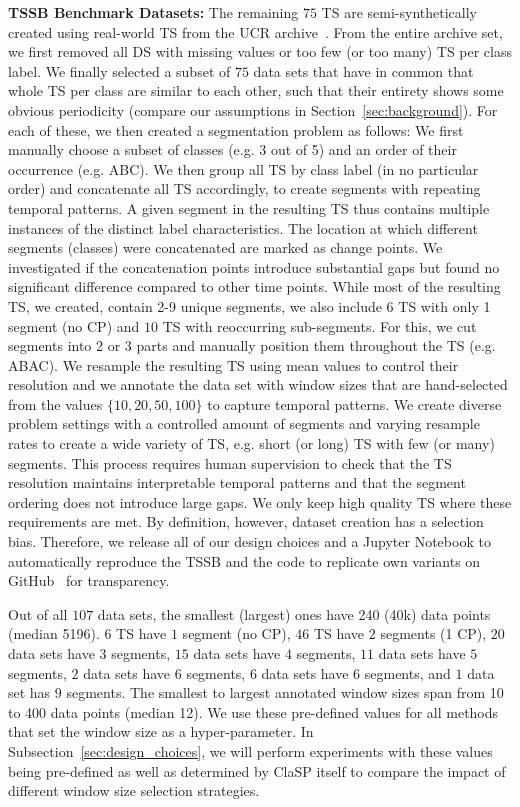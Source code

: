 \documentclass[pdflatex,sn-basic]{sn-jnl}
\begin{document}
\textbf{TSSB Benchmark Datasets:} The remaining $75$ TS are semi-synthetically created using real-world TS from the UCR archive~\citep{UCRClassification}. From the entire archive set, we first removed all DS with missing values or too few (or too many) TS per class label. We finally selected a subset of $75$ data sets that have in common that whole TS per class are similar to each other, such that their entirety shows some obvious periodicity (compare our assumptions in Section~\ref{sec:background}). For each of these, we then created a segmentation problem as follows: We first manually choose a subset of classes (e.g. 3 out of 5) and an order of their occurrence (e.g. ABC). We then group all TS by class label (in no particular order) and concatenate all TS accordingly, to create segments with repeating temporal patterns. A given segment in the resulting TS thus contains multiple instances of the distinct label characteristics. The location at which different segments (classes) were concatenated are marked as change points. We investigated if the concatenation points introduce substantial gaps but found no significant difference compared to other time points. While most of the resulting TS, we created, contain 2-9 unique segments, we also include $6$ TS with only 1 segment (no CP) and $10$ TS with reoccurring sub-segments. For this, we cut segments into 2 or 3 parts and manually position them throughout the TS (e.g. ABAC). We resample the resulting TS using mean values to control their resolution and we annotate the data set with window sizes that are hand-selected from the values $\{10,20,50,100\}$ to capture temporal patterns. We create diverse problem settings with a controlled  amount of segments and varying resample rates to create a wide variety of TS, e.g. short (or long) TS with few (or many) segments. This process requires human supervision to check that the TS resolution maintains interpretable temporal patterns and that the segment ordering does not introduce large gaps. We only keep high quality TS where these requirements are met. By definition, however, dataset creation has a selection bias. Therefore, we release all of our design choices and a Jupyter Notebook to automatically reproduce the TSSB and the code to replicate own variants on GitHub~\citep{TSSBWebpage} for transparency.

Out of all $107$ data sets, the smallest (largest) ones have 240 (40k) data points (median 5196). $6$ TS have $1$ segment (no CP), $46$ TS have $2$ segments (1 CP), $20$ data sets have $3$ segments, $15$ data sets have $4$ segments, $11$ data sets have $5$ segments, $2$ data sets have $6$ segments, $6$ data sets have $6$ segments, and $1$ data set has $9$ segments. The smallest to largest annotated window sizes span from 10 to 400 data points (median 12). We use these pre-defined values for all methods that set the window size as a hyper-parameter. In Subsection~\ref{sec:design_choices}, we will perform experiments with these values being pre-defined as well as determined by ClaSP itself to compare the impact of different window size selection strategies.
\end{document}
